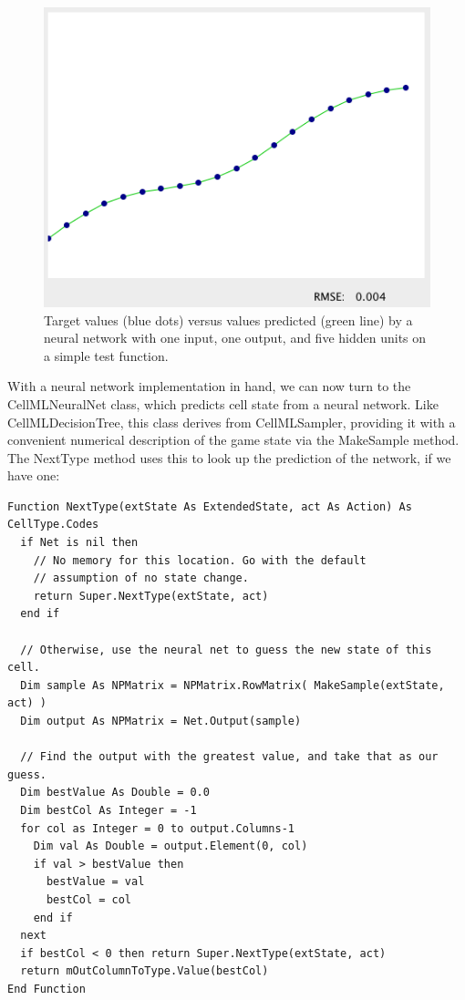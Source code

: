 \documentclass{article}
\begin{document}
\begin{figure}
  \begin{center}
    \includegraphics[width=4.5in]{figNNvalidation.png}
    \caption{Target values (blue dots) versus values predicted (green line) by a neural network with one input, one output, and five hidden units on a simple test function.}
    \label{figNNvalidation}
  \end{center}
\end{figure}

With a neural network implementation in hand, we can now turn to the CellMLNeuralNet class, which predicts cell state from a neural network.  Like CellMLDecisionTree, this class derives from CellMLSampler, providing it with a convenient numerical description of the game state via the MakeSample method.  The NextType method uses this to look up the prediction of the network, if we have one:

\begin{lstlisting}
Function NextType(extState As ExtendedState, act As Action) As CellType.Codes
  if Net is nil then
    // No memory for this location. Go with the default
    // assumption of no state change.
    return Super.NextType(extState, act)
  end if
  
  // Otherwise, use the neural net to guess the new state of this cell.
  Dim sample As NPMatrix = NPMatrix.RowMatrix( MakeSample(extState, act) )
  Dim output As NPMatrix = Net.Output(sample)
  
  // Find the output with the greatest value, and take that as our guess.
  Dim bestValue As Double = 0.0
  Dim bestCol As Integer = -1
  for col as Integer = 0 to output.Columns-1
    Dim val As Double = output.Element(0, col)
    if val > bestValue then
      bestValue = val
      bestCol = col
    end if
  next
  if bestCol < 0 then return Super.NextType(extState, act)
  return mOutColumnToType.Value(bestCol)
End Function
\end{lstlisting}
\end{document}
